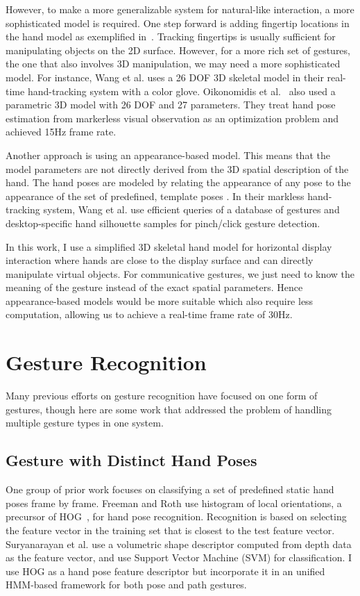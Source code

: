 However, to make a more generalizable system for natural-like interaction, a
more sophisticated model is required. One step forward is adding fingertip
locations in the hand model as exemplified in~\cite{Oka02, harrison11,
larson11}.
Tracking fingertips is usually sufficient for manipulating objects on the 2D surface. However, for a more rich set of gestures, the one
that also involves 3D manipulation, we may need a more sophisticated
model. For instance, Wang et al. \cite{Wang09} uses a 26 DOF
3D skeletal model in their real-time hand-tracking system with a color glove.
Oikonomidis et al.~\cite{oikonomidis11} also used a parametric 3D model with 26
DOF and 27 parameters. They treat hand pose estimation from markerless visual
observation as an optimization problem and achieved 15Hz frame rate.

Another approach is using an appearance-based model. This means that the model
parameters are not directly derived from the 3D spatial description of the hand.
The hand poses are modeled by relating the appearance of any pose to the 
appearance of the set of predefined, template poses \cite{Pavlovic97}. In
their markless hand-tracking system, Wang et al. \cite{wang11} use efficient
queries of a database of gestures and desktop-specific hand silhouette samples
for pinch/click gesture detection.

In this work, I use a simplified 3D
skeletal hand model for horizontal display interaction where hands are close
to the display surface and can directly manipulate virtual objects.
For communicative gestures, we just need to know the meaning of the gesture instead
of the exact spatial parameters. Hence appearance-based models would be
more suitable which also require less computation, allowing us to achieve
a real-time frame rate of 30Hz.

\section{Gesture Recognition}
Many previous efforts on gesture recognition have focused on one form of
gestures, though here are some work that addressed the problem of handling multiple gesture types in one system.

\subsection{Gesture with Distinct Hand Poses}
One group of prior work focuses on classifying a set of predefined static hand
poses frame by frame. Freeman and Roth \cite{freeman95} use histogram of local
orientations, a precursor of HOG~\cite{dalal05},
for hand pose recognition.
Recognition is based on selecting the feature vector in the training set that is closest to the test feature vector. 
Suryanarayan et al.
\cite{suryanarayan2010} use a volumetric shape descriptor computed from depth
data as the feature vector, and use Support Vector Machine (SVM) for
classification.
I use HOG as a hand pose feature descriptor but incorporate it in an unified HMM-based framework for both pose and path gestures.


